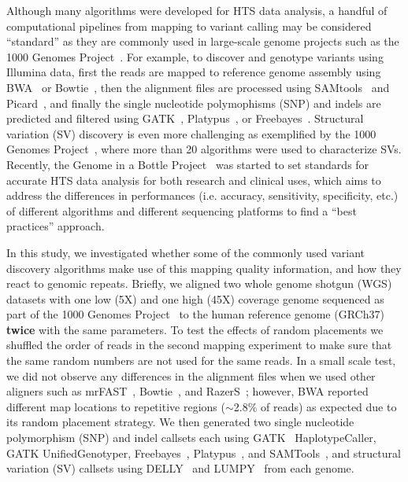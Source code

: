 \documentclass[10pt,a4paper]{article}
\begin{document}
Although many algorithms were developed for HTS data analysis, a handful of computational pipelines from mapping to variant calling may be considered ``standard'' as they are commonly used in large-scale genome projects such as the 1000 Genomes Project~\cite{1000GP,1000GP2012}. For example, to discover and genotype variants using Illumina data, first the reads are mapped to reference genome assembly using BWA~\cite{Li2009a} or Bowtie~\cite{Langmead2009}, then the alignment files are processed using SAMtools~\cite{Li2009b} and Picard~\cite{picard}, and finally the single nucleotide polymophisms (SNP) and indels are predicted and filtered using GATK~\cite{DePristo2011}, Platypus~\cite{Rimmer2014}, or Freebayes~\cite{Garrison2012}. 
Structural variation (SV) discovery is even more challenging as exemplified by the 1000 Genomes Project~\cite{1000GP,1000GP2012,Mills2011}, where more than 20 algorithms were used to characterize SVs.
Recently, the Genome in a Bottle Project~\cite{Zook2014} was started to set standards for accurate HTS data analysis for both research and clinical uses,
which aims to address the differences in performances (i.e. accuracy, sensitivity, specificity, etc.) of different algorithms and different sequencing platforms
 to find a ``best practices'' approach.

In this study, we investigated whether some of the commonly used variant discovery algorithms
make use of this mapping quality information, and how they react to genomic repeats.
Briefly, 
we aligned two whole genome shotgun (WGS) datasets with one low (5X) and one high (45X) coverage genome
sequenced as part of the 1000 Genomes Project~\cite{1000GP2012} to the human reference genome (GRCh37) {\bf twice} with the same parameters. 
To test the effects of random placements 
we shuffled the order of reads in the second mapping experiment to make sure that the same random numbers are not used for the same reads. 
In a small scale test, we did not observe any differences
in the alignment files when we used other aligners such as mrFAST~\cite{Alkan2009,Xin2013}, Bowtie~\cite{Langmead2009}, and RazerS~\cite{Weese2012}; however, 
BWA reported different map locations to repetitive regions ($\sim$2.8\% of reads) as expected due to its random placement strategy.
We then generated two single nucleotide polymorphism (SNP) and indel callsets each using GATK~\cite{DePristo2011} HaplotypeCaller, GATK UnifiedGenotyper, Freebayes~\cite{Garrison2012}, Platypus~\cite{Rimmer2014}, and SAMTools~\cite{Li2009b}, and structural variation (SV) callsets using DELLY~\cite{Rausch2012} and LUMPY~\cite{Layer2014} from each genome.
\end{document}
